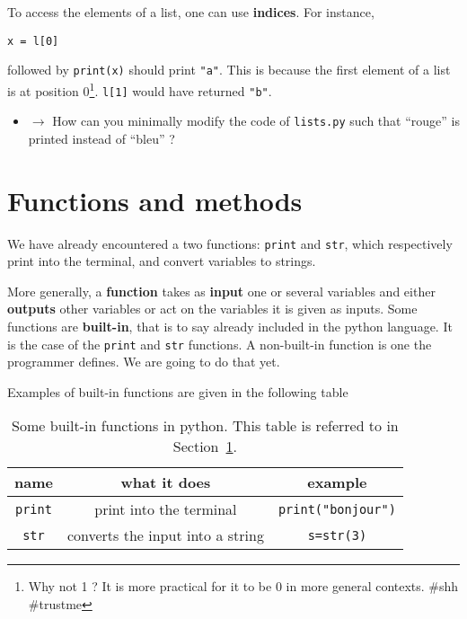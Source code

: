 \documentclass{article}
\begin{document}
To access the elements of a list, one can use \textbf{indices}. For instance,
\begin{center}
    {\tt x = l[0]}
\end{center}
followed by {\tt print(x)} should print {\tt "a"}. This is because the first
element of a list is at position 0\footnote{Why not 1 ? It is more practical
for it to be 0 in more general contexts. \#shh \#trustme}. {\tt l[1]} would have
returned {\tt "b"}.

\begin{mdframed}[backgroundcolor=black!20!white]
\begin{itemize}
    \item $\rightarrow$ How can you minimally modify the code of {\tt lists.py}
        such that ``rouge'' is printed instead of ``bleu'' ?
\end{itemize}
\end{mdframed}

\section{Functions and methods}
\label{functions}

We have already encountered a two functions: {\tt print} and {\tt str},
which respectively print into the terminal, and convert variables to strings.

More generally, a \textbf{function} takes as \textbf{input} one or
several variables and either \textbf{outputs} other variables or
act on the variables it is given as inputs. Some functions are
\textbf{built-in}, that is to say already included in the python language.
It is the case of the {\tt print} and {\tt str} functions. A non-built-in
function is one the programmer defines. We are going to do that yet.

Examples of built-in functions are given in the following table
\begin{table}
\centering
    \begin{tabular}{|c|c|c|}
    \hline
    name & what it does & example \\
    \hline
        {\tt print} & print into the terminal & {\tt print("bonjour")}\\
    \hline
        {\tt str} & converts the input into a string & {\tt s=str(3)}\\
    \hline
        
    \end{tabular}
    \caption{Some built-in functions in python. This table is referred to in Section~\ref{functions}.}
\end{table}
\end{document}

